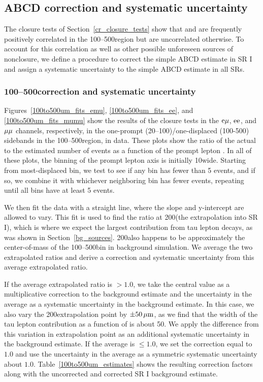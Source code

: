 

\subsection{ABCD correction and systematic uncertainty}
\label{abcd_correction}
The closure tests of Section~\ref{cr_closure_tests} show that \ada and \adb are frequently positively correlated in the 100--500\mum region but are uncorrelated otherwise. To account for this correlation as well as other possible unforeseen sources of nonclosure, we define a procedure to correct the simple ABCD estimate in SR I and assign a systematic uncertainty to the simple ABCD estimate in all SRs.

\subsubsection{100--500\mum correction and systematic uncertainty}
Figures~\ref{100to500um_fits_emu}, \ref{100to500um_fits_ee}, and \ref{100to500um_fits_mumu} show the results of the closure tests in the $\mathrm{e}{\mu}$, $\mathrm{e}\mathrm{e}$, and ${\mu}{\mu}$ channels, respectively, in the one-prompt (20--100\mum)/one-displaced (100-500\mum) sidebands in the 100--500\mum region, in data. These plots show the ratio of the actual to the estimated number of events as a function of the prompt lepton \ad. In all of these plots, the binning of the prompt lepton axis is initially 10\mum wide. Starting from most-displaced bin, we test to see if any bin has fewer than 5 events, and if so, we combine it with whichever neighboring bin has fewer events, repeating until all bins have at least 5 events.

We then fit the data with a straight line, where the slope and y-intercept are allowed to vary. This fit is used to find the ratio at 200\mum (the extrapolation into SR I), which is where we expect the largest contribution from tau lepton decays, as was shown in Section~\ref{bg_sources}. 200\mum also happens to be approximately the center-of-mass of the 100--500\mum bin in background simulation. We average the two extrapolated ratios and derive a correction and systematic uncertainty from this average extrapolated ratio.



If the average extrapolated ratio is $>1.0$, we take the central value as a multiplicative correction to the background estimate and the uncertainty in the average as a systematic uncertainty in the background estimate. In this case, we also vary the 200\mum extrapolation point by $\pm50\,\mu\text{m}$, as we find that the width of the tau lepton contribution as a function of \ad is about 50\mum. We apply the difference from this variation in extrapolation point as an additional systematic uncertainty in the background estimate. If the average is $\leq 1.0$, we set the correction equal to $1.0$ and use the uncertainty in the average as a symmetric systematic uncertainty about $1.0$. Table~\ref{100to500um_estimates} shows the resulting correction factors along with the uncorrected and corrected SR I background estimate.

